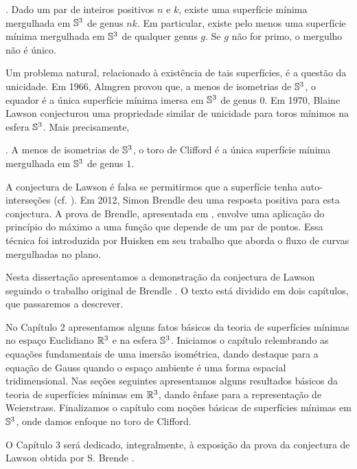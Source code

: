 \begin{teorema}\label{teo:lawson}
	\cite{Lawson1970}. Dado um par de inteiros positivos $n$ e $k$, existe uma superf\'icie
	m\'inima mergulhada em $\mathbb{S}^3$ de genus $nk$. Em particular, 
	existe pelo menos uma superf\'icie m\'inima mergulhada em $\mathbb{S}^3$
	de qualquer genus $g$. Se $g$ não for primo, o mergulho não é único.
\end{teorema}

Um problema natural, relacionado \`a exist\^encia de tais superf\'icies,
\'e a quest\~ao da unicidade. Em 1966, Almgren \cite{Almgren1966} 
provou que, a menos de isometrias de $\mathbb{S}^3$, o equador \'e a \'unica
superf\'icie m\'inima imersa em $\mathbb{S}^3$ de genus $0$.
Em 1970, Blaine Lawson \cite{Lawson1970a} conjecturou uma 
propriedade similar de unicidade para toros m\'inimos na esfera
$\mathbb{S}^3$. Mais precisamente,

\begin{conjectura}\label{teo:Lawson}
	\cite{Lawson1970a}. A menos de isometrias de $\mathbb{S}^3$, o toro de Clifford \'e a \'unica 
	superf\'icie m\'inima mergulhada em $\mathbb{S}^3$ de genus $1$.
\end{conjectura}

A conjectura de Lawson \'e falsa se permitirmos que a superf\'icie
tenha auto-interse\c c\~oes (cf. \cite{Lawson1969}). Em 2012, 
Simon Brendle deu uma resposta positiva para esta conjectura. 
A prova de Brendle, apresentada em \cite{Brendle2013a}, envolve
uma aplica\c c\~ao do princ\'ipio do m\'aximo a uma fun\c c\~ao 
que depende de um par de pontos. Essa t\'ecnica foi introduzida
por Huisken \cite{Huisken1998} em seu trabalho que aborda o 
fluxo de curvas mergulhadas no plano.

Nesta disserta\c c\~ao  apresentamos a 
demonstra\c c\~ao da conjectura de Lawson seguindo
o trabalho original de Brendle \cite{Brendle2013a}. O texto est\'a dividido em dois
cap\'itulos, que passaremos a descrever.

No Cap\'itulo 2 apresentamos alguns fatos b\'asicos da
teoria de superf\'icies m\'inimas no espa\c co Euclidiano
$\mathbb{R}^3$ e na esfera $\mathbb{S}^3$. Iniciamos o cap\'itulo 
relembrando as equa\c c\~oes fundamentais de uma 
imers\~ao isom\'etrica, dando destaque para a equa\c c\~ao
de Gauss quando o espa\c co ambiente \'e uma forma 
espacial tridimensional. Nas se\c c\~oes seguintes 
apresentamos alguns resultados b\'asicos da teoria de
superf\'icies m\'inimas em $\mathbb{R}^3$, dando \^enfase para
a representa\c c\~ao de Weierstrass. Finalizamos o
cap\'itulo com no\c c\~oes b\'asicas de superf\'icies 
m\'inimas em $\mathbb{S}^3$, onde damos enfoque no toro de
Clifford.

O Cap\'itulo 3 ser\'a dedicado, integralmente, \`a exposi\c c\~ao
da prova da conjectura de Lawson obtida por S. Brende
\cite{Brendle2013a}.
